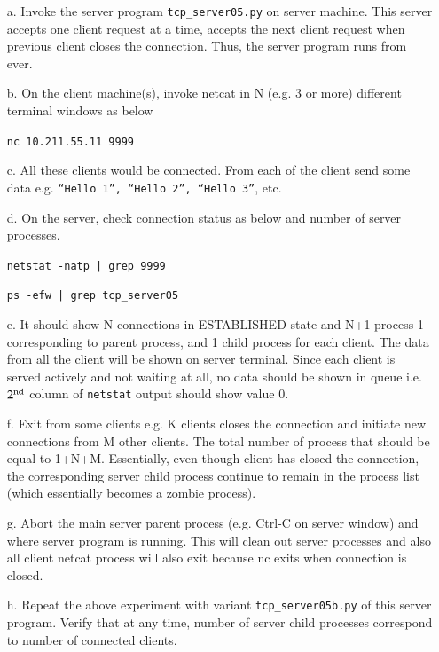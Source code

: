 \begin{multicols}{2}
\begin{itemize}

\item[a.] Invoke the server program \texttt{tcp\_server05.py} on server machine. This server accepts one client request at a time, accepts the next client request when previous client closes the connection. Thus, the server program runs from ever.

\item[b.] On the client machine(s), invoke netcat in N (e.g. 3 or more) different terminal windows as below

\texttt{nc 10.211.55.11 9999}

\item[c.] All these clients would be connected. From each of the client send some data e.g. \texttt{“Hello 1”, “Hello 2”, “Hello 3”}, etc.

\item[d.] On the server, check connection status as below and number of server processes. 
 
 \texttt{netstat -natp | grep 9999}
 
 \texttt{ps -efw | grep tcp\_server05}
 
\item[e.] It should show N connections in ESTABLISHED state and N+1 process 1 corresponding to parent process, and 1 child process for each client. The data from all the client will be shown on server terminal. Since each client is served actively and not waiting at all, no data should be shown in queue i.e. $2^{\rm nd}$ column of \texttt{netstat} output should show value 0.

\item[f.] Exit from some clients e.g. K clients closes the connection and initiate new connections from M other clients. The total number of process that should be equal to 1+N+M. Essentially, even though client has closed the connection, the corresponding server child process continue to remain in the process list (which essentially becomes a zombie process).

\item[g.] Abort the main server parent process (e.g. Ctrl-C on server window) and where server program is running. This will clean out server processes and also all client netcat process will also exit because nc exits when connection is closed.

\item[h.] Repeat the above experiment with variant \texttt{tcp\_server05b.py} of this server program. Verify that at any time, number of server child processes correspond to number of connected clients.


\end{itemize}
\end{multicols}
